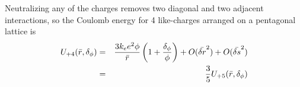 \documentclass[9pt,twocolumn,twoside,lineno]{pnas-new}
\begin{document}
Neutralizing any of the charges removes two diagonal and two adjacent interactions, so the Coulomb energy for 4 like-charges arranged on a pentagonal lattice is
\begin{eqnarray}
U_{+4}(\bar{r},\delta_{\phi}) &=& \frac{ 3 k_{e} e^{2}\phi}{\bar{r}}\left( 1+ \frac{\delta_{\phi}}{\phi} \right) + O(\bar{\delta r}^{2})+ O(\bar{\delta s}^{2})\\
& =& \frac{3}{5} U_{+5}(\bar{r},\delta_{\phi})
 \label{eq:mutant_pentamer}
\end{eqnarray} 
\end{document}
